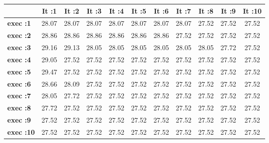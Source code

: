 \begin{tiny}\begin{tabular}{|l|c|c|c|c|c|c|c|c|c|c|}
\hline
&\textbf{It :1}&\textbf{It :2}&\textbf{It :3}&\textbf{It :4}&\textbf{It :5}&\textbf{It :6}&\textbf{It :7}&\textbf{It :8}&\textbf{It :9}&\textbf{It :10}\\\hline
\textbf{exec :1}&28.07&28.07&28.07&28.07&28.07&28.07&28.07&27.52&27.52&27.52\\\hline
\textbf{exec :2}&28.86&28.86&28.86&28.86&28.86&28.86&27.52&27.52&27.52&27.52\\\hline
\textbf{exec :3}&29.16&29.13&28.05&28.05&28.05&28.05&28.05&28.05&27.72&27.52\\\hline
\textbf{exec :4}&29.05&27.52&27.52&27.52&27.52&27.52&27.52&27.52&27.52&27.52\\\hline
\textbf{exec :5}&29.47&27.52&27.52&27.52&27.52&27.52&27.52&27.52&27.52&27.52\\\hline
\textbf{exec :6}&28.66&28.09&27.52&27.52&27.52&27.52&27.52&27.52&27.52&27.52\\\hline
\textbf{exec :7}&28.05&27.72&27.52&27.52&27.52&27.52&27.52&27.52&27.52&27.52\\\hline
\textbf{exec :8}&27.72&27.52&27.52&27.52&27.52&27.52&27.52&27.52&27.52&27.52\\\hline
\textbf{exec :9}&27.52&27.52&27.52&27.52&27.52&27.52&27.52&27.52&27.52&27.52\\\hline
\textbf{exec :10}&27.52&27.52&27.52&27.52&27.52&27.52&27.52&27.52&27.52&27.52\\\hline
\end{tabular}
\end{tiny}